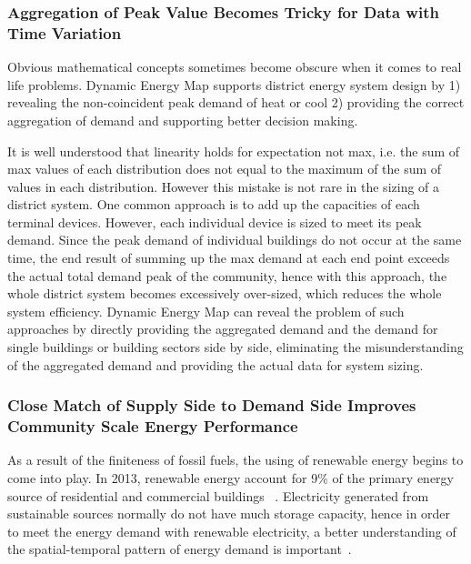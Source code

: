 \documentclass[hidelinks,12pt]{article}
\begin{document}
\subsubsection{Aggregation of Peak Value Becomes Tricky for Data with Time Variation}
Obvious mathematical concepts sometimes become obscure when it comes
to real life problems. Dynamic Energy Map supports district energy
system design by 1) revealing the non-coincident peak demand of heat
or cool 2) providing the correct aggregation of demand and supporting
better decision making.

It is well understood that linearity holds for expectation not max,
i.e. the sum of max values of each distribution does not equal to the
maximum of the sum of values in each distribution. However this
mistake is not rare in the sizing of a district system. One common
approach is to add up the capacities of each terminal
devices. However, each individual device is sized to meet its peak
demand. Since the peak demand of individual buildings do not occur at
the same time, the end result of summing up the max demand at each end
point exceeds the actual total demand peak of the community, hence
with this approach, the whole district system becomes excessively
over-sized, which reduces the whole system efficiency. Dynamic Energy
Map can reveal the problem of such approaches by directly providing
the aggregated demand and the demand for single buildings or building
sectors side by side, eliminating the misunderstanding of the
aggregated demand and providing the actual data for system sizing.

\begin{comment}
\subsubsection{Temporal Variation in Energy Generation, Storage
    Devices, Price Variation}
The commonly used renewable energy source includes: solar, wind,
geothermal, hydropower and biomass. Among these sources, solar energy
have strong temporal fluctuation as a result of the temporal variation
of solar radiation between different hours of a year and the time of
year~\cite{EIARenewable2015}. 
\end{comment}

\subsubsection{Close Match of Supply Side to Demand Side Improves
  Community Scale Energy Performance}
As a result of the finiteness of fossil fuels, the using of renewable
energy begins to come into play. In 2013, renewable energy account for
9\% of the primary energy source of residential and commercial
buildings ~\cite{EIAPrimary2013}. Electricity generated from
sustainable sources normally do not have much storage capacity, hence
in order to meet the energy demand with renewable electricity, a
better understanding of the spatial-temporal pattern of energy demand
is important~\cite{Mikkola2014256}.
\end{document}
